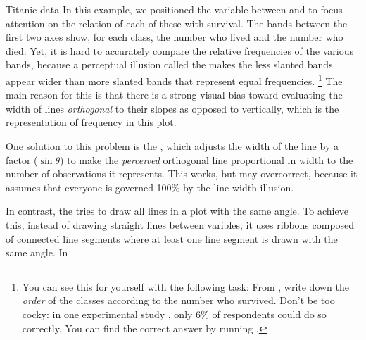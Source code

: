 \documentclass[11pt]{book}
\renewenvironment{knitrout}{\small\renewcommand{\baselinestretch}{.85}}{} %
\begin{document}
\begin{Example}{Titanic data}
\begin{knitrout}
\end{knitrout}
In this example, we positioned the variable  between
 and  to focus attention on the relation of each
of these with survival.  The bands between the 
first two axes show, for each class, the number who lived and the number who
died.
Yet, it is hard to accurately compare the relative frequencies of the
various bands, because a perceptual illusion called the 
makes the less slanted bands appear wider than more slanted bands that represent
equal frequencies.%
\footnote{
You can see this for yourself with the following task: From ,
write down the \emph{order} of the classes according to the number who survived.
Don't be too cocky: in one experimental study \citep{HofmannVendettuoli:2013},
only 6\% of respondents could do so correctly.
You can find the correct answer by running .
}
The main reason for this is that
there is a strong visual bias toward evaluating
the width of lines \emph{orthogonal} to their slopes as opposed to vertically,
which is the representation of frequency in this plot.

\end{Example}

One solution to this problem is the 
\citep{Schonlau:2003}, which adjusts the width of the line
by a factor ($\sin \theta$) to make the 
\emph{perceived} orthogonal line
proportional in width  to the number of observations it represents.
This works, but may overcorrect, because it assumes that everyone
is governed 100\% by the line width illusion. 

In contrast, the  \citep{HofmannVendettuoli:2013}
tries to draw all lines in a plot with the same angle.
To achieve this, instead of drawing straight lines between varibles, it
uses ribbons composed of connected line segments where at least one
line segment is drawn with the same angle. In 
\end{document}
